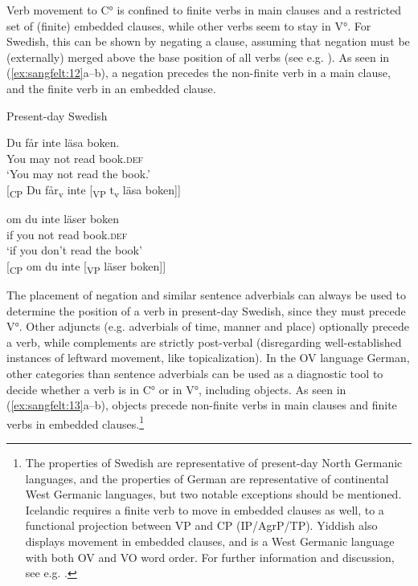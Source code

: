 \documentclass[output=paper, colorlinks, citecolor=brown]{langscibook}
\begin{document}
Verb movement to C° is confined to finite verbs in main clauses and a restricted set of (finite) embedded clauses, while other verbs seem to stay in V°. For Swedish, this can be shown by negating a clause, assuming that negation must be (externally) merged above the base position of all verbs (see e.g. \citealt{Zeijlstra2013}). As seen in (\ref{ex:sangfelt:12}a–b), a negation precedes the non-finite verb in a main clause, and the finite verb in an embedded clause.


\ea Present-day Swedish\label{ex:sangfelt:12}
\begin{multicols}{2}\raggedcolumns
\ea \label{ex:sangfelt:12a}
\gll Du får inte läsa boken. \\
 You may not read book.\textsc{def}\\
\glt ‘You may not read the book.’\\

[\textsubscript{CP} Du får\textsubscript{v} inte [\textsubscript{VP} t\textsubscript{v} läsa boken]]\columnbreak

\ex\label{ex:sangfelt:12b}
\gll om du inte läser boken \\ 
 if you not read book.\textsc{def}\\
\glt ‘if you don’t read the book’\\

[\textsubscript{CP} om du inte [\textsubscript{VP} läser boken]]
\z 
\end{multicols}
\z 

The placement of negation and similar sentence adverbials can always be used to determine the position of a verb in present-day Swedish, since they must precede V°. Other adjuncts (e.g. adverbials of time, manner and place) optionally precede a verb, while complements are strictly post-verbal (disregarding well-established instances of leftward movement, like topicalization). In the OV language German, other categories than sentence adverbials can be used as a diagnostic tool to decide whether a verb is in C° or in V°, including objects. As seen in (\ref{ex:sangfelt:13}a–b), objects precede non-finite verbs in main clauses and finite verbs in embedded clauses.\footnote{The properties of Swedish are representative of present-day North Germanic languages, and the properties of German are representative of continental West Germanic languages, but two notable exceptions should be mentioned. Icelandic requires a finite verb to move in embedded clauses as well, to a functional projection between VP and CP (IP/AgrP/TP). Yiddish also displays movement in embedded clauses, and is a West Germanic language with both OV and VO word order. For further information and discussion, see e.g. \citet[3–18]{Vikner2001}.}
\end{document}
